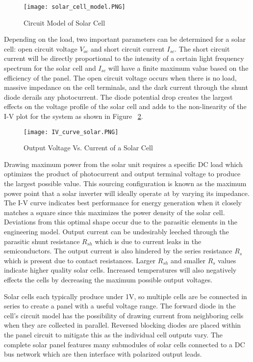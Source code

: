\begin{figure}
\centering
\texttt{[image: solar\_cell\_model.PNG]}
\caption{Circuit Model of Solar Cell}
\label{circuitModel}
\end{figure}

Depending on the load, two important parameters can be determined for a solar cell: open circuit voltage $V_{oc}$ and short circuit current $I_{sc}$. The short circuit current will be directly proportional to the intensity of a certain light frequency spectrum for the solar cell and $I_{sc}$ will have a finite maximum value based on the efficiency of the panel. The open circuit voltage occurs when there is no load, massive impedance on the cell terminals, and the dark current through the shunt diode derails any photocurrent. The diode potential drop creates the largest effects on the voltage profile of the solar cell and adds to the non-linearity of the I-V plot for the system as shown in Figure ~\ref{Output Voltage Vs. Current of a Solar Cell}. \cite{soteris}

\begin{figure}
\centering
\texttt{[image: IV\_curve\_solar.PNG]}
\caption{Output Voltage Vs. Current of a Solar Cell}
\label{Output Voltage Vs. Current of a Solar Cell}
\end{figure}

Drawing maximum power from the solar unit requires a specific DC load which optimizes the product of photocurrent and output terminal voltage to produce the largest possible value. This sourcing configuration is known as the maximum power point that a solar inverter will ideally operate at by varying its impedance. The I-V curve indicates best performance for energy generation when it closely matches a square since this maximizes the power density of the solar cell. Deviations from this optimal shape occur due to the parasitic elements in the engineering model. Output current can be undesirably leeched through the parasitic shunt resistance $R_{sh}$ which is due to current leaks in the semiconductors. The output current is also hindered by the series resistance $R_{s}$ which is present due to contact resistances. Larger $R_{sh}$ and smaller $R_{s}$ values indicate higher quality solar cells. Increased temperatures will also negatively effects the cells by decreasing the maximum possible output voltages.

Solar cells each typically produce under 1V, so multiple cells are be connected in series to create a panel with a useful voltage range. The forward diode in the cell's circuit model has the possibility of drawing current from neighboring cells when they are collected in parallel. Reversed blocking diodes are placed within the panel circuit to mitigate this as the individual cell outputs vary. The complete solar panel features many submodules of solar cells connected to a DC bus network which are then interface with polarized output leads.

